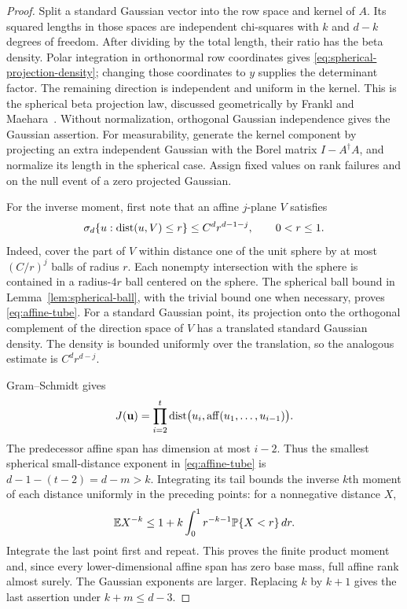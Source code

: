 \begin{proof}
Split a standard Gaussian vector into the row space and kernel of $A$.
Its squared lengths in those spaces are independent chi-squares with $k$
and $d-k$ degrees of freedom. After dividing by the total length, their
ratio has the beta density. Polar integration in orthonormal row coordinates
gives \eqref{eq:spherical-projection-density}; changing those coordinates
to $y$ supplies the determinant factor. The remaining direction is
independent and uniform in the kernel. This is the spherical beta
projection law, discussed geometrically by Frankl and
Maehara~\cite{FranklMaehara1990}. Without normalization, orthogonal Gaussian
independence gives the Gaussian assertion. For measurability, generate the
kernel component by projecting an extra independent Gaussian with the Borel
matrix $I-A^\dagger A$, and normalize its length in the spherical case.
Assign fixed values on rank failures and on the null event of a zero projected
Gaussian.

For the inverse moment, first note that an affine $j$-plane $V$ satisfies
\begin{equation}\label{eq:affine-tube}
 \sigma_d\{u:\operatorname{dist}(u,V)\le r\}\le C^d r^{d-1-j},\qquad 0<r\le1.
\end{equation}
Indeed, cover the part of $V$ within distance one of the unit sphere by at
most $(C/r)^j$ balls of radius $r$. Each nonempty intersection with the
sphere is contained in a radius-$4r$ ball centered on the sphere. The
spherical ball bound in Lemma~\ref{lem:spherical-ball}, with the trivial
bound one when necessary, proves \eqref{eq:affine-tube}. For a standard
Gaussian point, its projection onto the orthogonal complement of the direction
space of $V$ has a translated standard Gaussian density. The density is
bounded uniformly over the translation, so the analogous estimate is
$C^d r^{d-j}$.

Gram--Schmidt gives
\[
 J(\mathbf u)=\prod_{i=2}^t
 \operatorname{dist}\bigl(u_i,\operatorname{aff}(u_1,\ldots,u_{i-1})\bigr).
\]
The predecessor affine span has dimension at most $i-2$. Thus the smallest
spherical small-distance exponent in \eqref{eq:affine-tube} is
$d-1-(t-2)=d-m>k$. Integrating its tail bounds the inverse $k$th moment
of each distance uniformly in the preceding points: for a nonnegative
distance $X$,
\[
 \mathbb E X^{-k}\le1+k\int_0^1 r^{-k-1}\mathbb P\{X<r\}\,dr.
\]
Integrate the last point first and repeat. This proves the finite product
moment and, since every lower-dimensional affine span has zero base mass,
full affine rank almost surely. The Gaussian exponents are larger. Replacing
$k$ by $k+1$ gives the last assertion under $k+m\le d-3$.
\end{proof}


